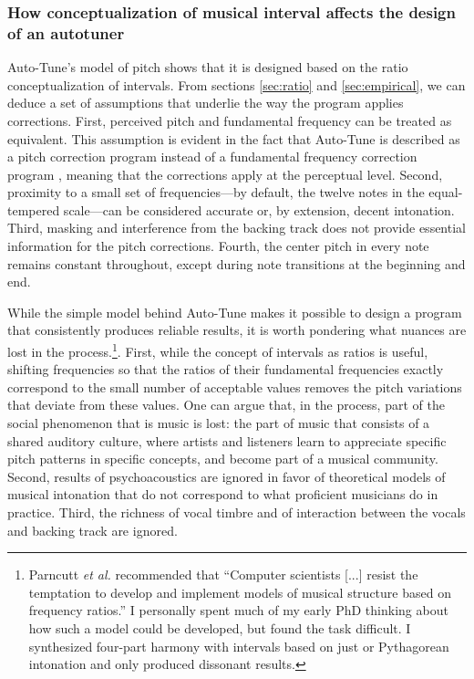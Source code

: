 \subsubsection{How conceptualization of musical interval affects the design of an autotuner}
\label{sec:interval-conceptualization-design}
Auto-Tune's model of pitch shows that it is designed based on the ratio conceptualization of intervals. From sections \ref{sec:ratio} and \ref{sec:empirical}, we can deduce a set of assumptions that underlie the way the program applies corrections. First, perceived pitch and fundamental frequency can be treated as equivalent. This assumption is evident in the fact that Auto-Tune is described as a pitch correction program instead of a fundamental frequency correction program \cite{antares:2018}, meaning that the corrections apply at the perceptual level. Second, proximity to a small set of frequencies---by default, the twelve notes in the equal-tempered scale---can be considered accurate or, by extension, decent intonation. Third, masking and interference from the backing track does not provide essential information for the pitch corrections. Fourth, the center pitch in every note remains constant throughout, except during note transitions at the beginning and end. 

While the simple model behind Auto-Tune makes it possible to design a program that consistently produces reliable results, it is worth pondering what nuances are lost in the process.\footnote{Parncutt \textit{et al.} recommended that ``Computer scientists [...] resist the temptation to develop and implement models of musical structure based on frequency ratios.'' I personally spent much of my early PhD thinking about how such a model could be developed, but found the task difficult. I synthesized four-part harmony with intervals based on just or Pythagorean intonation and only produced dissonant results.}. First, while the concept of intervals as ratios is useful, shifting frequencies so that the ratios of their fundamental frequencies exactly correspond to the small number of acceptable values removes the pitch variations that deviate from these values. One can argue that, in the process, part of the social phenomenon that is music is lost: the part of music that consists of a shared auditory culture, where artists and listeners learn to appreciate specific pitch patterns in specific concepts, and become part of a musical community. Second, results of psychoacoustics are ignored in favor of theoretical models of musical intonation that do not correspond to what proficient musicians do in practice. Third, the richness of vocal timbre and of interaction between the vocals and backing track are ignored. 

